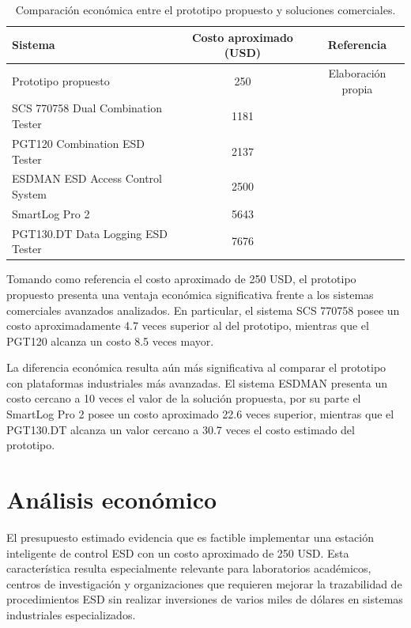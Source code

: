 \begin{table}[H]
\centering
\caption{Comparación económica entre el prototipo propuesto y soluciones comerciales.}
\label{tab:comparacion_costos}
\begin{tabular}{p{7.2cm} c c}
\toprule
\textbf{Sistema} & \textbf{Costo aproximado (USD)} & \textbf{Referencia} \\
\midrule
Prototipo propuesto & 250 & Elaboración propia \\
SCS 770758 Dual Combination Tester & 1181 & \cite{SCS_770758} \\
PGT120 Combination ESD Tester & 2137 & \cite{PGT120} \\
ESDMAN ESD Access Control System & 2500 & \cite{ESDMAN_0016809} \\
SmartLog Pro 2 & 5643 & \cite{SmartLogPro2} \\
PGT130.DT Data Logging ESD Tester & 7676 & \cite{PGT130DT} \\
\bottomrule
\end{tabular}
\end{table}

Tomando como referencia el costo aproximado de 250 USD, el prototipo propuesto presenta una ventaja económica significativa 
frente a los sistemas comerciales avanzados analizados. En particular, el sistema SCS 770758 posee un costo aproximadamente 
4.7 veces superior al del prototipo, mientras que el PGT120 alcanza un costo 8.5 veces mayor. 

La diferencia económica resulta aún más significativa al comparar el prototipo con plataformas industriales más avanzadas. 
El sistema ESDMAN presenta un costo cercano a 10 veces el valor de la solución propuesta, por su parte el 
SmartLog Pro 2 posee un costo aproximado 22.6 veces superior, mientras que 
el PGT130.DT alcanza un valor cercano a 30.7 veces el costo estimado del prototipo.


\section{Análisis económico}

El presupuesto estimado evidencia que es factible implementar una estación 
inteligente de control ESD con un costo aproximado de 250 USD. Esta característica 
resulta especialmente relevante para laboratorios académicos, centros de investigación 
y organizaciones que requieren mejorar la trazabilidad de procedimientos ESD sin realizar 
inversiones de varios miles de dólares en sistemas industriales especializados.

